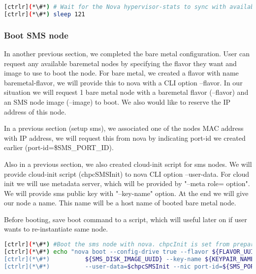 
\begin{lstlisting}[language=bash,keywords={}]
[ctrlr](*\#*) # Wait for the Nova hypervisor-stats to sync with available Ironic resources
[ctrlr](*\#*) sleep 121
\end{lstlisting} 

\subsubsection{Boot SMS node}

	In another previous section, we completed the bare metal configuration. User can request any available baremetal nodes by specifying the flavor they want and image to use to boot the node. For bare metal, we created a flavor with name baremetal-flavor, we will provide this to nova with a CLI option --flavor. In our situation we will request 1 bare metal node with a baremetal flavor (--flavor) and an SMS node image (--image) to boot.  We also would like to reserve the IP address of this node. 

	In a previous section (setup sms), we associated one of the nodes MAC address with IP address, we will request this from nova by indicating port-id we created earlier (port-id=\${SMS\_PORT\_ID}). 

	Also in a previous section, we also created cloud-init script for sms nodes. We will provide cloud-init script (chpcSMSInit) to nova CLI option --user-data. For cloud init we will use metadata server, which will be provided by "--meta role= option". We will provide sms public key with "--key-name" option. At the end we will give our node a name. This name will be a host name of booted bare metal node.

	Before booting, save boot command to a script, which will useful later on if user wants to re-instantiate same node.


\begin{lstlisting}[language=bash,keywords={}]
[ctrlr](*\#*) #Boot the sms node with nova. chpcInit is set from prepare_cloudInit
[ctrlr](*\#*) echo "nova boot --config-drive true --flavor ${FLAVOR_UUID} --image \
[ctrlr](*\#*)          ${SMS_DISK_IMAGE_UUID} --key-name ${KEYPAIR_NAME} --meta role=webservers \
[ctrlr](*\#*)          --user-data=$chpcSMSInit --nic port-id=${SMS_PORT_ID} ${sms_name}" > boot_sms
\end{lstlisting} 

